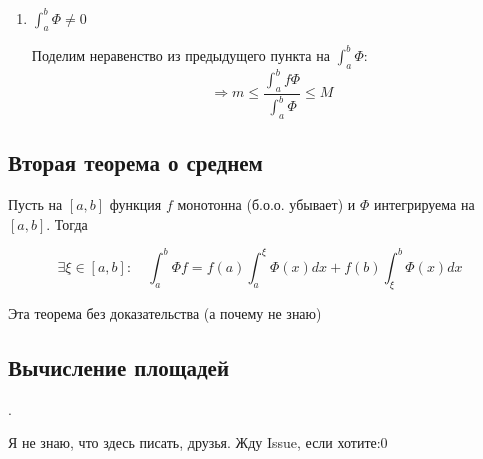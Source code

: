 \documentclass[a4paper]{article}
\begin{document}
\begin{definit}
\begin{hproof}
\begin{enumerate}
\item $\int_a^b \Phi \neq 0$

Поделим неравенство из предыдущего пункта на $\int_a^b \Phi$:
\[
\Rightarrow  m \leq \frac{\int_a^b f \Phi}{\int_a^b \Phi} \leq M
\]


\end{enumerate}
\end{hproof}

\end{definit}

\begin{definit}
\subsection*{Вторая теорема о среднем}
Пусть на $[a,b]$ функция $f$ монотонна (б.о.о. убывает) и $\Phi$ интегрируема на $[a,b]$. Тогда

\[
\exists \xi \in [a,b]: \quad \int_a^b \Phi f = f(a) \int_a^{\xi} \Phi(x)dx + f(b) \int_{\xi}^b\Phi(x)dx
\]

Эта теорема без доказательства (а почему не знаю)
\end{definit}





\begin{definit}
\hypertarget{p19}{}
\subsection*{Вычисление площадей}.

Я не знаю, что здесь писать, друзья. Жду Issue, если хотите:0

\end{definit}
\end{document}

